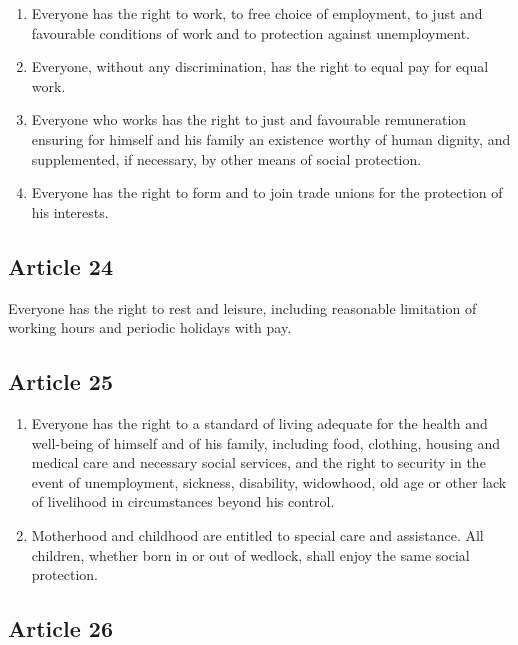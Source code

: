 \documentclass[
  titlepage,
  openright,
  DIV=calc,
  toc=listof,
  listof=nochaptergap]{scrbook}
\begin{document}
\begin{enumerate}
\def\labelenumi{\arabic{enumi}.}
\item
  Everyone has the right to work, to free choice of employment, to just
  and favourable conditions of work and to protection against
  unemployment.
\item
  Everyone, without any discrimination, has the right to equal pay for
  equal work.
\item
  Everyone who works has the right to just and favourable remuneration
  ensuring for himself and his family an existence worthy of human
  dignity, and supplemented, if necessary, by other means of social
  protection.
\item
  Everyone has the right to form and to join trade unions for the
  protection of his interests.
\end{enumerate}

\subsection{Article 24}\label{article-24-2}

Everyone has the right to rest and leisure, including reasonable
limitation of working hours and periodic holidays with pay.

\subsection{Article 25}\label{article-25-2}

\begin{enumerate}
\def\labelenumi{\arabic{enumi}.}
\item
  Everyone has the right to a standard of living adequate for the health
  and well-being of himself and of his family, including food, clothing,
  housing and medical care and necessary social services, and the right
  to security in the event of unemployment, sickness, disability,
  widowhood, old age or other lack of livelihood in circumstances beyond
  his control.
\item
  Motherhood and childhood are entitled to special care and assistance.
  All children, whether born in or out of wedlock, shall enjoy the same
  social protection.
\end{enumerate}

\subsection{Article 26}\label{article-26-2}
\end{document}
